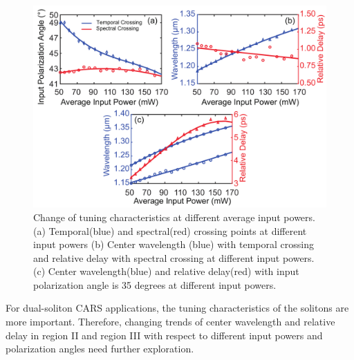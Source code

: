 \documentclass{osa-article}
\begin{document}
\begin{figure}[htbp]
\centering%
\includegraphics[width=320pt]{fig_tuning.pdf}
\caption{Change of tuning characteristics at different average input powers. (a) Temporal(blue) and spectral(red) crossing points at different input powers (b) Center wavelength (blue) with temporal crossing and relative delay with spectral crossing at different input powers. (c) Center wavelength(blue) and relative delay(red) with input polarization angle is 35 degrees at different input powers.}
\label{fig_tuning}\vspace*{-6pt}
\end{figure}

For dual-soliton CARS applications\cite{chen_dual-soliton_2016,chen_quantitative_2016}, the tuning characteristics of the solitons are more important. Therefore, changing trends of center wavelength and relative delay in region II and region III with respect to different input powers and polarization angles need further exploration.  
\end{document}
